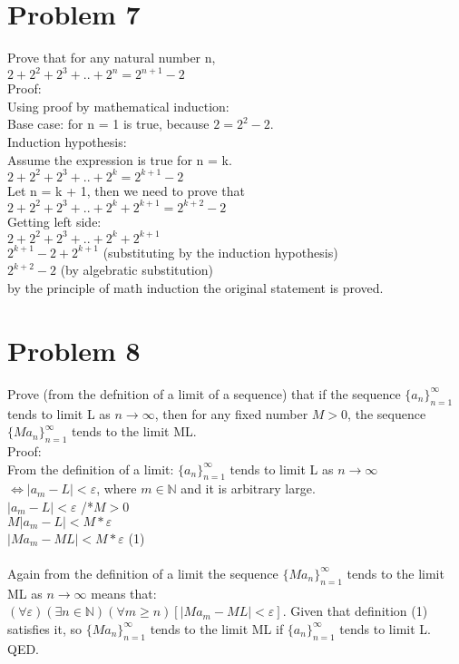 \documentclass{article}
\begin{document}
\section*{Problem 7}
Prove that for any natural number n,\\
$2 + 2^2 + 2^3 + .. + 2^n = 2^{n+1}-2$\\
Proof:\\
Using proof by mathematical induction:\\
Base case: for n = 1 is true, because $2 = 2^2 - 2$.\\
Induction hypothesis:\\
Assume the expression is true for n = k.\\
$2 + 2^2 + 2^3 + .. + 2^k = 2^{k+1} - 2$\\
Let n = k + 1, then we need to prove that\\
$2 + 2^2 + 2^3 + .. + 2^k + 2^{k+1} = 2^{k+2} - 2$\\
Getting left side:\\
$2 + 2^2 + 2^3 + .. + 2^k + 2^{k+1}$\\
$2^{k+1} - 2 + 2^{k+1}$ (substituting by the induction hypothesis)\\
$2^{k+2}-2$ (by algebratic substitution)\\
by the principle of math induction the original statement is proved.

\section*{Problem 8}
Prove (from the defnition of a limit of a sequence) that if the sequence $\{a_n\}_{n=1}^\infty$ tends to limit L as $n \rightarrow \infty$, then for any fixed number $M > 0$, the sequence $\{Ma_n\}_{n=1}^\infty$  tends to the limit ML.\\
Proof:\\
From the definition of a limit:
$\{a_n\}_{n=1}^\infty$ tends to limit L as $n \rightarrow \infty$ $\Leftrightarrow |a_m - L| < \varepsilon$, where $m \in \mathbb{N}$ and it is arbitrary large.\\
$|a_m - L| < \varepsilon$ /*$M > 0$\\
$M|a_m - L| < M*\varepsilon$\\
$|Ma_m - ML| < M*\varepsilon$ (1)\\
\\
Again from the definition of a limit the sequence $\{Ma_n\}_{n=1}^\infty$  tends to the limit ML as $n \rightarrow \infty$ means that:\\
$(\forall \varepsilon)(\exists n \in \mathbb{N})(\forall m \geq n)[|Ma_m - ML| < \varepsilon]$. Given that definition (1) satisfies it, so $\{Ma_n\}_{n=1}^\infty$  tends to the limit ML if  $\{a_n\}_{n=1}^\infty$ tends to limit L. QED.
\end{document}
